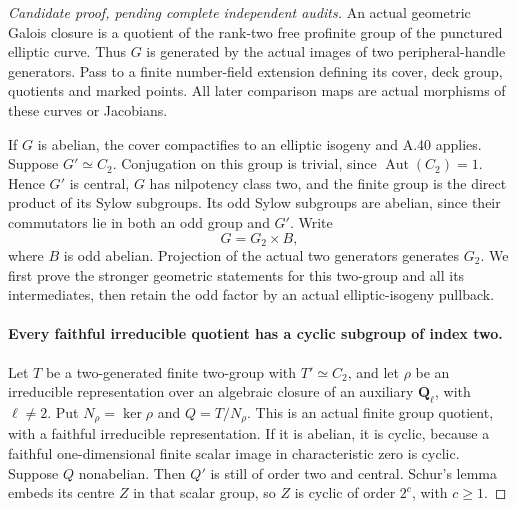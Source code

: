 \begin{proof}[Candidate proof, pending complete independent audits]
An actual geometric Galois closure is a quotient of the
rank-two free profinite group of the punctured elliptic
curve. Thus \(G\) is generated by the actual images
of two peripheral-handle generators. Pass to a finite
number-field extension defining its cover, deck group,
quotients and marked points. All later comparison maps
are actual morphisms of these curves or Jacobians.

If \(G\) is abelian, the cover compactifies to an
elliptic isogeny and A.40 applies. Suppose \(G'\simeq C_2\).
Conjugation on this group is trivial, since
\(\operatorname{Aut}(C_2)=1\). Hence \(G'\) is central,
\(G\) has nilpotency class two, and the finite group
is the direct product of its Sylow subgroups. Its odd
Sylow subgroups are abelian, since their commutators
lie in both an odd group and \(G'\). Write
\[
                            G=G_2\times B,
                                                        \tag{A.77.2}
\]
where \(B\) is odd abelian. Projection of the actual
two generators generates \(G_2\). We first prove the
stronger geometric statements for this two-group and
all its intermediates, then retain the odd factor by
an actual elliptic-isogeny pullback.

\paragraph{Every faithful irreducible quotient has a cyclic subgroup of index two.}
Let \(T\) be a two-generated finite two-group with
\(T'\simeq C_2\), and let \(\rho\) be an irreducible representation over
an algebraic closure of an auxiliary \(\mathbf Q_\ell\),
with \(\ell\ne2\). Put \(N_\rho=\ker\rho\)
and \(Q=T/N_\rho\). This is an actual finite group
quotient, with a faithful irreducible representation.
If it is abelian, it is cyclic, because a faithful
one-dimensional finite scalar image in characteristic zero is cyclic.
Suppose \(Q\) nonabelian. Then \(Q'\) is still
of order two and central. Schur's lemma embeds its
centre \(Z\) in that scalar group, so \(Z\)
is cyclic of order \(2^c\), with \(c\ge1\).


\end{proof}
